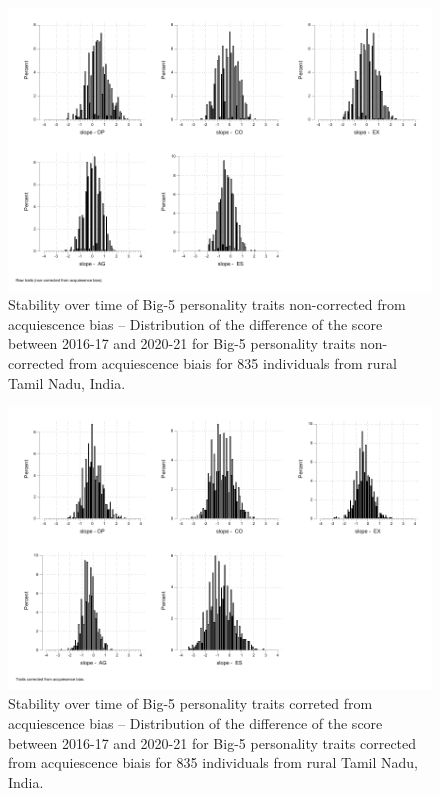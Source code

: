 \documentclass[a4paper, 12pt, onecolumn]{article}
\begin{document}
\begin{figure}[!htb]
\raggedright
\includegraphics[scale=0.86]{INPUT/diffcont_raw}
\caption{Stability over time of Big-5 personality traits non-corrected from acquiescence bias -- Distribution of the difference of the score between 2016-17 and 2020-21 for Big-5 personality traits non-corrected from acquiescence biais for 835 individuals from rural Tamil Nadu, India.}
\label{fig:stabraw}
\end{figure}

\begin{figure}[!htb]
\raggedright
\includegraphics[scale=0.86]{INPUT/diffcont_cor}
\caption{Stability over time of Big-5 personality traits correted from acquiescence bias -- Distribution of the difference of the score between 2016-17 and 2020-21 for Big-5 personality traits corrected from acquiescence biais for 835 individuals from rural Tamil Nadu, India.}
\label{fig:stabcor}
\end{figure}
\end{document}
